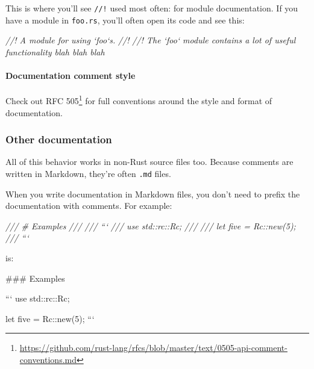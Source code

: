 \documentclass[a4paper,]{book}
\newenvironment{Shaded}{\begin{snugshade}}{\end{snugshade}}
\newcommand{\CommentTok}[1]{\textcolor[rgb]{0.56,0.35,0.01}{\textit{{#1}}}}
\newcommand{\FunctionTok}[1]{\textcolor[rgb]{0.00,0.00,0.00}{{#1}}}
\newcommand{\NormalTok}[1]{{#1}}
\renewcommand{\href}[2]{#2\footnote{\url{#1}}}
\let\oldparagraph\paragraph
\renewcommand{\paragraph}[1]{\oldparagraph{#1}\mbox{}}
\begin{document}
This is where you'll see \texttt{//!} used most often: for module
documentation. If you have a module in \texttt{foo.rs}, you'll often
open its code and see this:

\begin{Shaded}
\begin{Highlighting}[]
\CommentTok{//! A module for using `foo`s.}
\CommentTok{//!}
\CommentTok{//! The `foo` module contains a lot of useful functionality blah blah blah}
\end{Highlighting}
\end{Shaded}

\paragraph{Documentation comment
style}\label{documentation-comment-style}

Check out
\href{https://github.com/rust-lang/rfcs/blob/master/text/0505-api-comment-conventions.md}{RFC
505} for full conventions around the style and format of documentation.

\subsubsection{Other documentation}\label{other-documentation}

All of this behavior works in non-Rust source files too. Because
comments are written in Markdown, they're often \texttt{.md} files.

When you write documentation in Markdown files, you don't need to prefix
the documentation with comments. For example:

\begin{Shaded}
\begin{Highlighting}[]
\CommentTok{/// # Examples}
\CommentTok{///}
\CommentTok{/// ```}
\CommentTok{/// use std::rc::Rc;}
\CommentTok{///}
\CommentTok{/// let five = Rc::new(5);}
\CommentTok{/// ```}
\end{Highlighting}
\end{Shaded}

is:

\begin{Shaded}
\begin{Highlighting}[]
\FunctionTok{### Examples}

\NormalTok{```}
\NormalTok{use std::rc::Rc;}

\NormalTok{let five = Rc::new(5);}
\NormalTok{```}
\end{Highlighting}
\end{Shaded}
\end{document}
